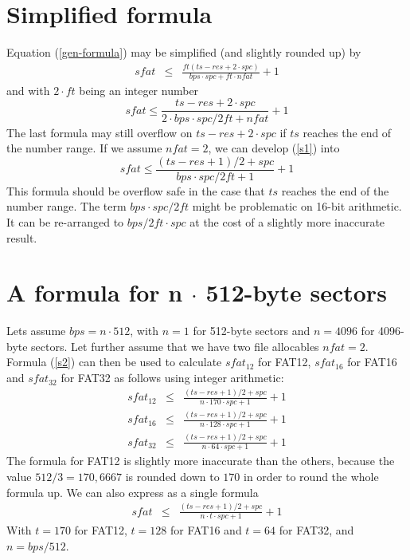 \documentclass[12pt]{article}
\begin{document}
\section{Simplified formula}
Equation (\ref{gen-formula}) may be simplified (and slightly rounded up) by
\begin{eqnarray}
sfat &\le& \frac{ft(ts - res + 2 \cdot spc)}{bps \cdot spc + ft \cdot nfat} + 1 \nonumber
\end{eqnarray}
and with $2 \cdot ft$ being an integer number
\begin{equation}
\label{s1}
sfat \le \frac{ts - res + 2 \cdot spc}{2 \cdot bps \cdot spc / 2 ft + nfat} + 1
\end{equation}
The last formula may still overflow on $ts - res + 2 \cdot spc$ if $ts$ reaches the end of the number range. If we assume $nfat = 2$, we can develop (\ref{s1}) into
\begin{equation}
\label{s2}
sfat \le \frac{(ts - res + 1) / 2 + spc}{bps \cdot spc / 2 ft + 1} + 1
\end{equation}
This formula should be overflow safe in the case that $ts$ reaches the end of the number range. The term $bps \cdot spc / 2 ft$ might be problematic on 16-bit arithmetic. It can be re-arranged to $bps / 2 ft \cdot spc$ at the cost of a slightly more inaccurate result.


\section{A formula for n $\cdot$ 512-byte sectors}
Lets assume $bps = n \cdot 512$, with $n = 1$ for 512-byte sectors and $n = 4096$ for 4096-byte sectors. Let further assume that we have two file allocables $nfat = 2$. Formula (\ref{s2}) can then be used to calculate $sfat_{12}$ for FAT12, $sfat_{16}$ for FAT16 and $sfat_{32}$ for FAT32 as follows using integer arithmetic:
\begin{eqnarray}
sfat_{12} &\le& \frac{(ts - res + 1) / 2 + spc}{n \cdot 170\cdot spc + 1} + 1\\
sfat_{16} &\le& \frac{(ts - res + 1) / 2 + spc}{n \cdot 128 \cdot spc + 1} + 1\\
sfat_{32} &\le& \frac{(ts - res + 1) / 2 + spc}{n \cdot 64 \cdot spc + 1} + 1
\end{eqnarray}
The formula for FAT12 is slightly more inaccurate than the others, because the value $512 / 3 = 170,6667$ is rounded down to $170$ in order to round the whole formula up. We can also express as a single formula
\begin{eqnarray}
sfat &\le& \frac{(ts - res + 1) / 2 + spc}{n \cdot t \cdot spc + 1} + 1
\end{eqnarray}
With $t = 170$ for FAT12, $t = 128$ for FAT16 and $t = 64$ for FAT32, and $n = bps / 512$.
\end{document}
